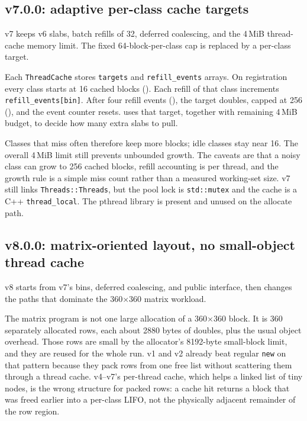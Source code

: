 \subsection{v7.0.0: adaptive per-class cache targets}

v7 keeps v6 slabs, batch refills of 32, deferred coalescing, and the 4\,MiB
thread-cache memory limit.
The fixed 64-block-per-class cap is replaced by a per-class target.

Each \texttt{ThreadCache} stores \texttt{targets} and \texttt{refill\_events}
arrays.
On registration every class starts at 16 cached blocks
().
Each refill of that class increments \texttt{refill\_events[bin]}.
After four refill events (), the target doubles,
capped at 256 (), and the event
counter resets.
 uses that target, together with remaining
4\,MiB budget, to decide how many extra slabs to pull.

Classes that miss often therefore keep more blocks; idle classes stay near 16.
The overall 4\,MiB limit still prevents unbounded growth.
The caveats are that a noisy class can grow to 256 cached blocks, refill
accounting is per thread, and the growth rule is a simple miss count rather than
a measured working-set size.
v7 still links \texttt{Threads::Threads}, but the pool lock is
\texttt{std::mutex} and the cache is a C++ \texttt{thread\_local}.
The pthread library is present and unused on the allocate path.

\subsection{v8.0.0: matrix-oriented layout, no small-object thread cache}

v8 starts from v7's bins, deferred coalescing, and public interface, then
changes the paths that dominate the 360$\times$360 matrix workload.

The matrix program is not one large allocation of a 360$\times$360 block.
It is 360 separately allocated rows, each about 2880 bytes of doubles, plus
the usual object overhead.
Those rows are small by the allocator's 8192-byte small-block limit, and they
are reused for the whole run.
v1 and v2 already beat regular \texttt{new} on that pattern because they pack
rows from one free list without scattering them through a thread cache.
v4--v7's per-thread cache, which helps a linked list of tiny nodes, is the
wrong structure for packed rows: a cache hit returns a block that was freed
earlier into a per-class LIFO, not the physically adjacent remainder of the
row region.


